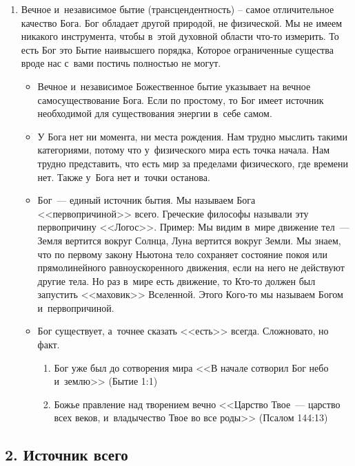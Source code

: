 \documentclass[a4paper,12pt]{article}
\begin{document}
\begin{enumerate}
    \item Вечное и~независимое бытие (трансцендентность) – самое отличительное качество Бога. Бог обладает другой природой, не физической. Мы не имеем никакого инструмента, чтобы в~этой духовной области что-то измерить. То есть Бог это Бытие наивысшего порядка, Которое ограниченные существа вроде нас с~вами постичь полностью не могут. 
    
    \begin{itemize}
        \item Вечное и~независимое Божественное бытие указывает на вечное самосуществование Бога. Если по простому, то Бог имеет источник необходимой для существования энергии в~себе самом.
        \item У Бога нет ни момента, ни места рождения. Нам трудно мыслить такими категориями, потому что у~физического мира есть точка начала. Нам трудно представить, что есть мир за пределами физического, где времени нет. Также у~Бога нет и~точки останова.
        \item Бог~--- единый источник бытия. Мы называем Бога <<первопричиной>> всего. Греческие философы называли эту первопричину <<Логос>>. Пример: Мы видим в~мире движение тел~--- Земля вертится вокруг Солнца, Луна вертится вокруг Земли. Мы знаем, что по первому закону Ньютона тело сохраняет состояние покоя или прямолинейного равноускоренного движения, если на него не действуют другие тела. Но раз в~мире есть движение, то Кто-то должен был запустить <<маховик>> Вселенной. Этого Кого-то мы называем Богом и~первопричиной.
        \item Бог существует, а~точнее сказать <<есть>> всегда. Сложновато, но факт.
        \begin{enumerate}
            \item Бог уже был до сотворения мира <<В начале сотворил Бог небо и~землю>> (Бытие 1:1)
            \item Божье правление над творением вечно <<Царство Твое~--- царство всех веков, и~владычество Твое во все роды>> (Псалом 144:13)
        \end{enumerate}
    \end{itemize}
\end{enumerate}
        
\subsection{2. Источник всего}        
            
\end{document}

